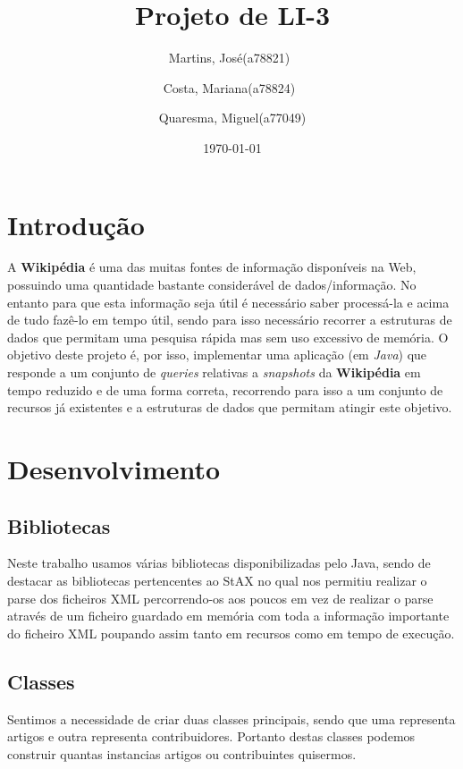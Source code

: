 \documentclass[a4paper,11pt]{article}
\title{Projeto de LI-3}
\author{Martins, José(a78821)\
        \and
        Costa, Mariana(a78824)\
        \and
        Quaresma, Miguel(a77049)
        }
\date{\today}
\begin{document}
\begin{titlepage}
\maketitle
\end{titlepage}

\tableofcontents
\newpage

\section{Introdução}
A \textbf{Wikipédia} é uma  das muitas fontes de informação disponíveis na Web, possuindo uma quantidade bastante considerável de dados/informação.
No entanto para que esta informação seja útil é necessário saber processá-la e acima de tudo fazê-lo em tempo útil, sendo para isso necessário recorrer a estruturas de dados que permitam uma pesquisa rápida mas sem uso excessivo de memória. O objetivo deste projeto é, por isso, implementar uma aplicação (em \textit{Java}) que responde a um conjunto de \textit{queries} relativas a \textit{snapshots} da \textbf{Wikipédia} em tempo reduzido e de uma forma correta, recorrendo para isso a um conjunto de recursos já existentes e a estruturas de dados que permitam atingir este objetivo.

\section{Desenvolvimento}

\subsection{Bibliotecas}
Neste trabalho usamos várias bibliotecas disponibilizadas pelo Java, sendo de destacar as bibliotecas pertencentes ao StAX no qual nos permitiu realizar o parse dos ficheiros XML percorrendo-os aos poucos em vez de realizar o parse através de um ficheiro guardado em memória com toda a informação importante do ficheiro XML poupando assim tanto em recursos como em tempo de execução. 

\subsection{Classes}
Sentimos a necessidade de criar duas classes principais, sendo que uma representa artigos e outra representa contribuidores. Portanto destas classes podemos construir quantas instancias artigos ou contribuintes quisermos. 
\end{document}
